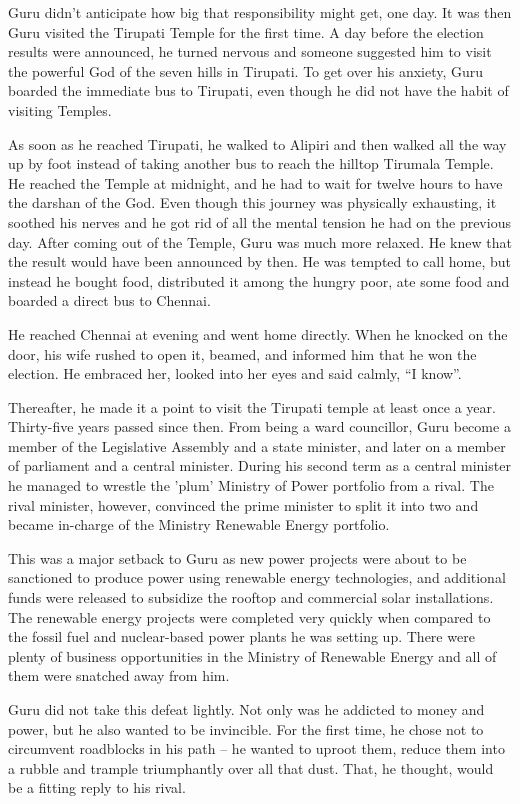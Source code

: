 Guru didn't anticipate how big that responsibility might get, one day. It was
then Guru visited the Tirupati Temple for the first time. A day before the
election results were announced, he turned nervous and someone suggested him to
visit the powerful God of the seven hills in Tirupati. To get over his anxiety,
Guru boarded the immediate bus to Tirupati, even though he did not have the
habit of visiting Temples.

As soon as he reached Tirupati, he walked to Alipiri and then walked all the way
up by foot instead of taking another bus to reach the hilltop Tirumala Temple.
He reached the Temple at midnight, and he had to wait for twelve hours to have
the darshan of the God. Even though this journey was physically exhausting, it
soothed his nerves and he got rid of all the mental tension he had on the
previous day. After coming out of the Temple, Guru was much more relaxed. He
knew that the result would have been announced by then. He was tempted to call
home, but instead he bought food, distributed it among the hungry poor, ate some
food and boarded a direct bus to Chennai.

He reached Chennai at evening and went home directly. When he knocked on the
door, his
wife rushed to open it, beamed, and informed him that he won the election. He
embraced her, looked into her eyes and said calmly, “I know”.

Thereafter, he made it a point to visit the Tirupati temple at least once a
year. Thirty-five years passed since then. From being a ward councillor, Guru
become a member of the Legislative Assembly and a state minister, and later on
a member of parliament and a central minister. During his second term as a central
minister he managed to wrestle the 'plum' Ministry of Power portfolio from a rival.
The rival minister, however, convinced the prime minister to split it
into two and became in-charge of the Ministry Renewable Energy portfolio.

This was a major setback to Guru as new power projects were about to be
sanctioned to produce power using renewable energy technologies, and additional
funds were released to subsidize the rooftop and commercial solar installations.
The renewable energy projects were completed very quickly when compared to the
fossil fuel and nuclear-based power plants he was setting up. There were plenty of
business opportunities in the Ministry of Renewable Energy and all of them were
snatched away from him.

Guru did not take this defeat lightly. Not only was he addicted to money and
power, but he also wanted to be invincible. For the first time, he chose not to
circumvent roadblocks in his path – he wanted to uproot them, reduce them into a
rubble and trample triumphantly over all that dust. That, he thought, would be a
fitting reply to his rival.
